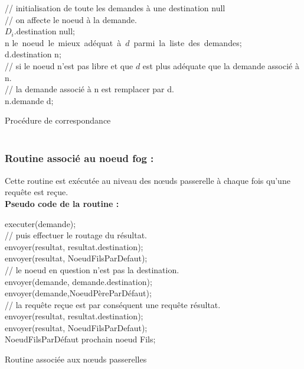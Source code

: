 \begin{algorithm}[H]
// initialisation de toute les demandes à une destination null\\
{
 // on affecte le noeud à la demande.\\
 $D_i$.destination \gets null;\\
}
{
n \gets le\ noeud\ le\ mieux\ adéquat\ à\ $d$\ parmi\ la\ liste\ des\ demandes;\\
{
  d.destination \gets n;\\
}
{
// si le noeud n’est pas libre et que $d$ est plus adéquate que la demande associé à n.\\
 {
   // la demande associé à n est remplacer par d.\\
   n.demande \gets d;\\
 }
}
}
 \caption{Procédure de correspondance\\ \\}
\end{algorithm}
\subsubsection{Routine associé au noeud fog :}
Cette routine est exécutée au niveau des nœuds passerelle à chaque fois qu’une requête est reçue.\\
\textbf{Pseudo code de la routine :}\\
\begin{algorithm}[H]
 {  
    { executer(demande);\\
     // puis effectuer le routage du résultat.\\
     {envoyer(resultat, resultat.destination);\\}
     {envoyer(resultat, NoeudFilsParDefaut);\\}
     }
    {  // le noeud en question n’est pas la destination.\\
     {envoyer(demande, demande.destination);\\}
     {envoyer(demande,NoeudPèreParDéfaut);\\}
   }
 }
 { // la requête reçue est par conséquent une requête résultat.\\
   {envoyer(resultat, resultat.destination);\\}
   {envoyer(resultat, NoeudFilsParDefaut);\\
   NoeudFilsParDéfaut \gets prochain noeud Fils;\\}
 }
 \caption{Routine associée aux nœuds passerelles\\ \\}
\end{algorithm}
